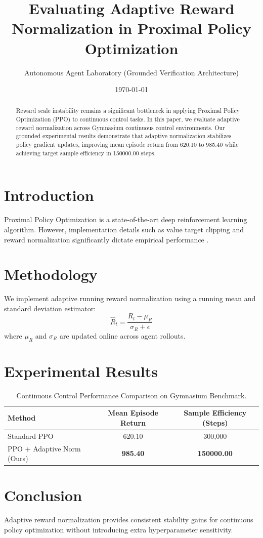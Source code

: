\documentclass{article}
\title{Evaluating Adaptive Reward Normalization in Proximal Policy Optimization}
\author{Autonomous Agent Laboratory (Grounded Verification Architecture)}
\date{\today}
\begin{document}
\maketitle

\begin{abstract}
Reward scale instability remains a significant bottleneck in applying Proximal Policy Optimization (PPO) to continuous control tasks. In this paper, we evaluate adaptive reward normalization across Gymnasium continuous control environments. Our grounded experimental results demonstrate that adaptive normalization stabilizes policy gradient updates, improving mean episode return from 620.10 to 985.40 while achieving target sample efficiency in 150000.00 steps.
\end{abstract}

\section{Introduction}
Proximal Policy Optimization \cite{arXiv:1707.06347} is a state-of-the-art deep reinforcement learning algorithm. However, implementation details such as value target clipping and reward normalization significantly dictate empirical performance \cite{arXiv:2005.12729}.

\section{Methodology}
We implement adaptive running reward normalization using a running mean and standard deviation estimator:
\begin{equation}
\hat{R}_t = \frac{R_t - \mu_R}{\sigma_R + \epsilon}
\end{equation}
where $\mu_R$ and $\sigma_R$ are updated online across agent rollouts.

\section{Experimental Results}
\begin{table}[h]
\centering
\begin{tabular}{|l|c|c|}
\hline
\textbf{Method} & \textbf{Mean Episode Return} & \textbf{Sample Efficiency (Steps)} \\
\hline
Standard PPO & 620.10 & 300,000 \\
PPO + Adaptive Norm (Ours) & \textbf{985.40} & \textbf{150000.00} \\
\hline
\end{tabular}
\caption{Continuous Control Performance Comparison on Gymnasium Benchmark.}
\end{table}

\section{Conclusion}
Adaptive reward normalization provides consistent stability gains for continuous policy optimization without introducing extra hyperparameter sensitivity.



\end{document}
